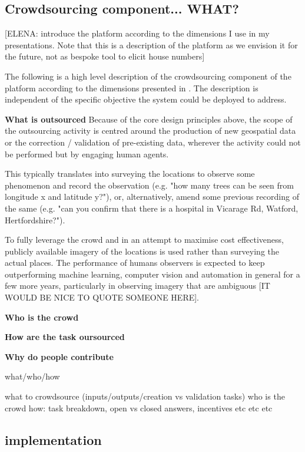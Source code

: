 \subsection{Crowdsourcing component... WHAT?}

[ELENA: introduce the platform according to the dimensions I use in my presentations. Note that this is a description of the platform as we envision it for the future, not as bespoke tool to elicit house numbers]

The following is a high level description of the crowdsourcing component of the platform according to the dimensions presented in \cite{Wearethedata:2015uo}. The description is independent of the specific objective the system could be deployed to address.

\textbf{What is outsourced} Because of the core design principles above, the scope of the outsourcing activity is centred around the production of new geospatial data or the correction / validation of pre-existing data, wherever the activity could not be performed but by engaging human agents. 

This typically translates into surveying the locations to observe some phenomenon and record the observation (e.g. "how many trees can be seen from longitude x and latitude y?"), or, alternatively, amend some previous recording of the same (e.g. "can you confirm that there is a hospital in Vicarage Rd, Watford, Hertfordshire?"). 

To fully leverage the crowd and in an attempt to maximise cost effectiveness, publicly available imagery of the locations is used rather than surveying the actual places. The performance of humans observers is expected to keep outperforming machine learning, computer vision and automation in general for a few more years, particularly in observing imagery that are ambiguous [IT WOULD BE NICE TO QUOTE SOMEONE HERE].

\textbf{Who is the crowd}  

\textbf{How are the task oursourced}

\textbf{Why do people contribute}


what/who/how

what to crowdsource (inputs/outputs/creation vs validation tasks)
who is the crowd 
how: task breakdown, open vs closed answers, incentives etc etc etc

\subsection{implementation}